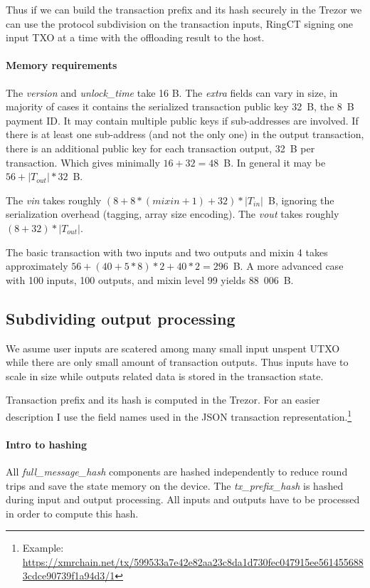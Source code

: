 \documentclass[]{article}
\begin{document}
Thus if we can build the transaction prefix and its hash securely in the Trezor we can use the protocol subdivision on the transaction inputs, RingCT signing one input TXO at a time with the offloading result to the host. 

\paragraph{Memory requirements}
The \emph{version} and \emph{unlock\_time} take 16 B. The \emph{extra} fields can vary in size, in majority of cases it contains the serialized transaction public key 32~B, the 8~B payment ID. It may contain multiple public keys if sub-addresses are involved. If there is at least one sub-address (and not the only one) in the output transaction, there is an additional public key for each transaction output, 32~B per transaction. Which gives minimally $16 + 32 = 48$~B. In general it may be $56 + \left|T_{out}\right| * 32$~B.

The \emph{vin} takes roughly $(8 + 8 * (mixin + 1) + 32) * \left|T_{in}\right|$~B, ignoring the serialization overhead (tagging, array size encoding). The \emph{vout} takes roughly $(8 + 32) * \left|T_{out}\right|$.

The basic transaction with two inputs and two outputs and mixin 4 takes approximately $56 + (40 + 5*8)*2 + 40*2 = 296$~B. A more advanced case with 100 inputs, 100 outputs, and mixin level 99 yields 88~006~B.  

\subsection{Subdividing output processing}
We asume user inputs are scatered among many small input unspent UTXO while there are only small amount of transaction outputs. Thus inputs have to scale in size while outputs related data is stored in the transaction state.

Transaction prefix and its hash is computed in the Trezor.
For an easier description I use the field names used in the JSON transaction representation.\footnote{Example: \url{https://xmrchain.net/tx/599533a7e42e82aa23c8da1d730fec047915ee5614556883cdce90739f1a94d3/1}}

\paragraph{Intro to hashing}
All \emph{full\_message\_hash} components are hashed independently to reduce round trips and save the state memory on the device.
The \emph{tx\_prefix\_hash} is hashed during input and output processing. All inputs and outputs have to be processed in order to compute this hash.
\end{document}
